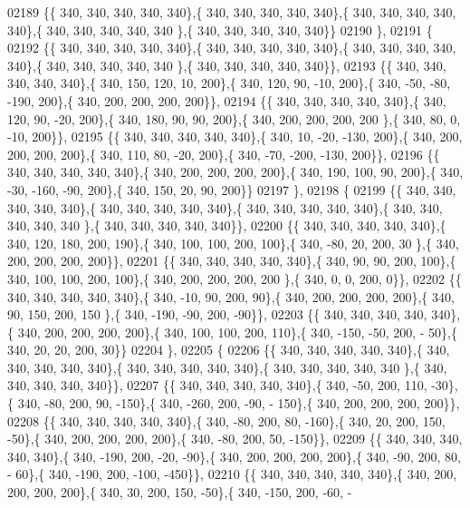 \begin{DoxyCode}
02189 \{\{ 340, 340, 340, 340, 340\},\{ 340, 340, 340, 340, 340\},\{ 340, 340, 340, 340, 340\},\{ 340, 340, 340, 340, 340
      \},\{ 340, 340, 340, 340, 340\}\}
02190 \},
02191 \{
02192 \{\{ 340, 340, 340, 340, 340\},\{ 340, 340, 340, 340, 340\},\{ 340, 340, 340, 340, 340\},\{ 340, 340, 340, 340, 340
      \},\{ 340, 340, 340, 340, 340\}\},
02193 \{\{ 340, 340, 340, 340, 340\},\{ 340, 150, 120,  10, 200\},\{ 340, 120,  90, -10, 200\},\{ 340, -50, -80, -190, 
      200\},\{ 340, 200, 200, 200, 200\}\},
02194 \{\{ 340, 340, 340, 340, 340\},\{ 340, 120,  90, -20, 200\},\{ 340, 180,  90,  90, 200\},\{ 340, 200, 200, 200, 200
      \},\{ 340,  80,   0, -10, 200\}\},
02195 \{\{ 340, 340, 340, 340, 340\},\{ 340,  10, -20, -130, 200\},\{ 340, 200, 200, 200, 200\},\{ 340, 110,  80, -20, 
      200\},\{ 340, -70, -200, -130, 200\}\},
02196 \{\{ 340, 340, 340, 340, 340\},\{ 340, 200, 200, 200, 200\},\{ 340, 190, 100,  90, 200\},\{ 340, -30, -160, -90, 
      200\},\{ 340, 150,  20,  90, 200\}\}
02197 \},
02198 \{
02199 \{\{ 340, 340, 340, 340, 340\},\{ 340, 340, 340, 340, 340\},\{ 340, 340, 340, 340, 340\},\{ 340, 340, 340, 340, 340
      \},\{ 340, 340, 340, 340, 340\}\},
02200 \{\{ 340, 340, 340, 340, 340\},\{ 340, 120, 180, 200, 190\},\{ 340, 100, 100, 200, 100\},\{ 340, -80,  20, 200,  30
      \},\{ 340, 200, 200, 200, 200\}\},
02201 \{\{ 340, 340, 340, 340, 340\},\{ 340,  90,  90, 200, 100\},\{ 340, 100, 100, 200, 100\},\{ 340, 200, 200, 200, 200
      \},\{ 340,   0,   0, 200,   0\}\},
02202 \{\{ 340, 340, 340, 340, 340\},\{ 340, -10,  90, 200,  90\},\{ 340, 200, 200, 200, 200\},\{ 340,  90, 150, 200, 150
      \},\{ 340, -190, -90, 200, -90\}\},
02203 \{\{ 340, 340, 340, 340, 340\},\{ 340, 200, 200, 200, 200\},\{ 340, 100, 100, 200, 110\},\{ 340, -150, -50, 200, -
      50\},\{ 340,  20,  20, 200,  30\}\}
02204 \},
02205 \{
02206 \{\{ 340, 340, 340, 340, 340\},\{ 340, 340, 340, 340, 340\},\{ 340, 340, 340, 340, 340\},\{ 340, 340, 340, 340, 340
      \},\{ 340, 340, 340, 340, 340\}\},
02207 \{\{ 340, 340, 340, 340, 340\},\{ 340, -50, 200, 110, -30\},\{ 340, -80, 200,  90, -150\},\{ 340, -260, 200, -90, -
      150\},\{ 340, 200, 200, 200, 200\}\},
02208 \{\{ 340, 340, 340, 340, 340\},\{ 340, -80, 200,  80, -160\},\{ 340,  20, 200, 150, -50\},\{ 340, 200, 200, 200, 
      200\},\{ 340, -80, 200,  50, -150\}\},
02209 \{\{ 340, 340, 340, 340, 340\},\{ 340, -190, 200, -20, -90\},\{ 340, 200, 200, 200, 200\},\{ 340, -90, 200,  80, -
      60\},\{ 340, -190, 200, -100, -450\}\},
02210 \{\{ 340, 340, 340, 340, 340\},\{ 340, 200, 200, 200, 200\},\{ 340,  30, 200, 150, -50\},\{ 340, -150, 200, -60, -

\end{DoxyCode}
